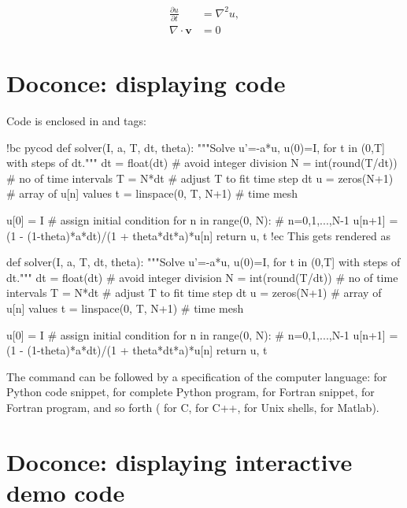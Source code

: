 \documentclass[%
oneside,                 %
final,                   %
chapterprefix=true,      %
open=right               %
10pt]{book}
\newenvironment{graybox1admon}[1][]{
\begin{graybox1mdframed}[frametitle=#1]
}
{
\end{graybox1mdframed}
}
\begin{document}
\begin{align}
\frac{\partial u}{\partial t} &= \nabla^2 u,
\label{a:eq}\\
\nabla\cdot\pmb{v} & = 0
\label{b:eq}
\end{align}


\section{Doconce: displaying code}

Code is enclosed in  and  tags:

\bccq
!bc pycod
def solver(I, a, T, dt, theta):
    """Solve u'=-a*u, u(0)=I, for t in (0,T] with steps of dt."""
    dt = float(dt)           # avoid integer division
    N = int(round(T/dt))     # no of time intervals
    T = N*dt                 # adjust T to fit time step dt
    u = zeros(N+1)           # array of u[n] values
    t = linspace(0, T, N+1)  # time mesh

    u[0] = I                 # assign initial condition
    for n in range(0, N):    # n=0,1,...,N-1
        u[n+1] = (1 - (1-theta)*a*dt)/(1 + theta*dt*a)*u[n]
    return u, t
!ec
\eccq
This gets rendered as

\bpycod
def solver(I, a, T, dt, theta):
    """Solve u'=-a*u, u(0)=I, for t in (0,T] with steps of dt."""
    dt = float(dt)           # avoid integer division
    N = int(round(T/dt))     # no of time intervals
    T = N*dt                 # adjust T to fit time step dt
    u = zeros(N+1)           # array of u[n] values
    t = linspace(0, T, N+1)  # time mesh

    u[0] = I                 # assign initial condition
    for n in range(0, N):    # n=0,1,...,N-1
        u[n+1] = (1 - (1-theta)*a*dt)/(1 + theta*dt*a)*u[n]
    return u, t
\epycod


\begin{graybox1admon}[Language-dependent typesetting of code:]
The  command can be followed by a specification of the computer
language:  for Python code snippet,  for complete Python
program,  for Fortran snippet,  for Fortran program, and so
forth ( for C,  for C++,  for Unix shells,  for Matlab).
\end{graybox1admon}

\section{Doconce: displaying interactive demo code}
\label{slide:pot}
\end{document}
